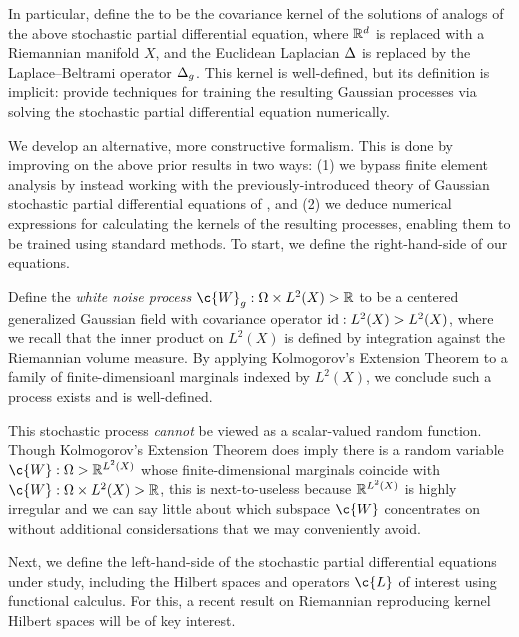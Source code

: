 \documentclass[11pt]{book}
\begin{document}
In particular, \textcite{lindgren11} define the  to be the covariance kernel of the solutions of analogs of the above stochastic partial differential equation, where $\mathbb{R}^d$ is replaced with a Riemannian manifold $X$, and the Euclidean Laplacian $\Delta$ is replaced by the Laplace--Beltrami operator $\Delta_g$.
This kernel is well-defined, but its definition is implicit: \textcite{lindgren11} provide techniques for training the resulting Gaussian processes via solving the stochastic partial differential equation numerically.

We develop an alternative, more constructive formalism.
This is done by improving on the above prior results in two ways: (1) we bypass finite element analysis by instead working with the previously-introduced theory of Gaussian stochastic partial differential equations of \textcite{lototsky17}, and (2) we deduce numerical expressions for calculating the kernels of the resulting processes, enabling them to be trained using standard methods.
To start, we define the right-hand-side of our equations.

\begin{definition}
Define the \emph{white noise process} $\c{W}_g : \Omega \x L^2(X) \-> \R$ to be a centered generalized Gaussian field with covariance operator $\operatorname{id} : L^2(X) \-> L^2(X)$, where we recall that the inner product on $L^2(X)$ is defined by integration against the Riemannian volume measure.
By applying Kolmogorov's Extension Theorem to a family of finite-dimensioanl marginals indexed by $L^2(X)$, we conclude such a process exists and is well-defined.
\end{definition}

This stochastic process \emph{cannot} be viewed as a scalar-valued random function.
Though Kolmogorov's Extension Theorem does imply there is a random variable $\c{W} : \Omega \-> \R^{L^2(X)}$ whose finite-dimensional marginals coincide with $\c{W} : \Omega \x L^2(X) \-> \R$, this is next-to-useless because $\mathbb{R}^{L^2(X)}$ is highly irregular and we can say little about which subspace $\c{W}$ concentrates on without additional considersations that we may conveniently avoid.

Next, we define the left-hand-side of the stochastic partial differential equations under study, including the Hilbert spaces and operators $\c{L}$ of interest using functional calculus.
For this, a recent result on Riemannian reproducing kernel Hilbert spaces will be of key interest.
\end{document}
